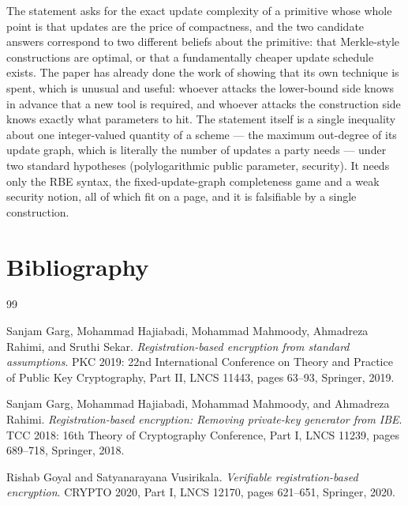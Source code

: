 \documentclass{conjura-conjecture}
\begin{document}
\begin{remark}\label{rem:interest}
The statement asks for the exact update complexity of a primitive whose
whole point is that updates are the price of compactness, and the two
candidate answers correspond to two different beliefs about the
primitive: that Merkle-style constructions are optimal, or that a
fundamentally cheaper update schedule exists. The paper has already done
the work of showing that its own technique is spent, which is unusual
and useful: whoever attacks the lower-bound side knows in advance that a
new tool is required, and whoever attacks the construction side knows
exactly what parameters to hit. The statement itself is a single
inequality about one integer-valued quantity of a scheme --- the maximum
out-degree of its update graph, which is literally the number of updates
a party needs --- under two standard hypotheses (polylogarithmic public
parameter, security). It needs only the RBE syntax, the
fixed-update-graph completeness game and a weak security notion, all of
which fit on a page, and it is falsifiable by a single construction.
\end{remark}

\section{Bibliography}

\begin{conjurabibliography}{99}

Sanjam Garg, Mohammad Hajiabadi, Mohammad Mahmoody, Ahmadreza Rahimi,
and Sruthi Sekar.
\emph{Registration-based encryption from standard assumptions}.
PKC 2019: 22nd International Conference on Theory and Practice of Public
Key Cryptography, Part II, LNCS 11443, pages 63--93, Springer, 2019.

Sanjam Garg, Mohammad Hajiabadi, Mohammad Mahmoody, and Ahmadreza
Rahimi.
\emph{Registration-based encryption: Removing private-key generator from
IBE}.
TCC 2018: 16th Theory of Cryptography Conference, Part I, LNCS 11239,
pages 689--718, Springer, 2018.

Rishab Goyal and Satyanarayana Vusirikala.
\emph{Verifiable registration-based encryption}.
CRYPTO 2020, Part I, LNCS 12170, pages 621--651, Springer, 2020.

\end{conjurabibliography}
\end{document}

